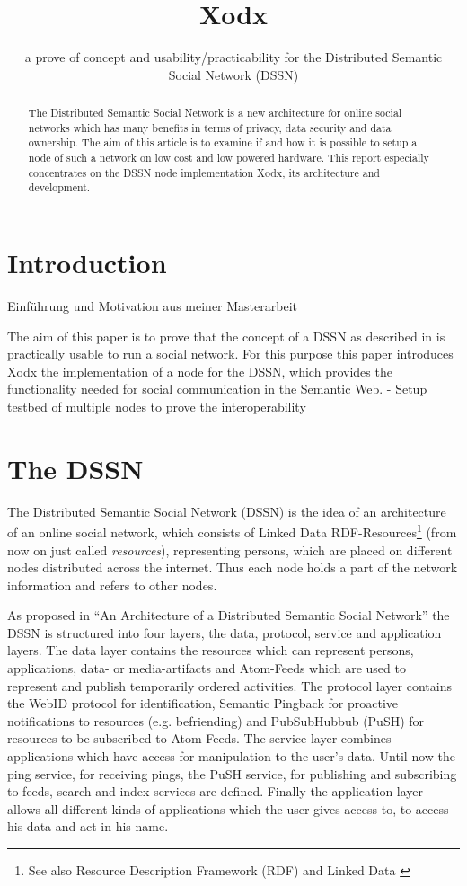 \documentclass{llncs}
\title{Xodx}
\subtitle{a prove of concept and usability/practicability for the Distributed Semantic Social Network (DSSN)}
\author{}
\institute{\email{\{lastname\}@informatik.uni-leipzig.de}}
\begin{document}
\maketitle

\begin{abstract}
The Distributed Semantic Social Network is a new architecture for online social networks which has many benefits in terms of privacy, data security and data ownership.
The aim of this article is to examine if and how it is possible to setup a node of such a network on low cost and low powered hardware.
This report especially concentrates on the DSSN node implementation Xodx, its architecture and development.
\end{abstract}

\section{Introduction}
Einführung und Motivation aus meiner Masterarbeit

The aim of this paper is to prove that the concept of a DSSN as described in \cite{tramp-s-2012--a} is practically usable to run a social network.
For this purpose this paper introduces Xodx the implementation of a node for the DSSN, which provides the functionality needed for social communication in the Semantic Web.
- Setup testbed of multiple nodes to prove the interoperability


\section{The DSSN}
The Distributed Semantic Social Network (DSSN) is the idea of an architecture of an online social network, which consists of Linked Data RDF-Resources\footnote{See also Resource Description Framework (RDF) \cite{lassila-o-1999--a} and Linked Data \cite{bernerslee-t-2009--}} (from now on just called \emph{resources}), representing persons, which are placed on different nodes distributed across the internet.
Thus each node holds a part of the network information and refers to other nodes.

As proposed in “An Architecture of a Distributed Semantic Social Network” \cite{tramp-s-2012--a} the DSSN is structured into four layers, the data, protocol, service and application layers.
The data layer contains the resources which can represent persons, applications, data- or media-artifacts and Atom-Feeds which are used to represent and publish temporarily ordered activities.
The protocol layer contains the WebID protocol for identification, Semantic Pingback \cite{tramp-s-2010--b} for proactive notifications to resources (e.g. befriending) and PubSubHubbub (PuSH) for resources to be subscribed to Atom-Feeds.
The service layer combines applications which have access for manipulation to the user's data. Until now the ping service, for receiving pings, the PuSH service, for publishing and subscribing to feeds, search and index services are defined.
Finally the application layer allows all different kinds of applications which the user gives access to, to access his data and act in his name.
\end{document}
